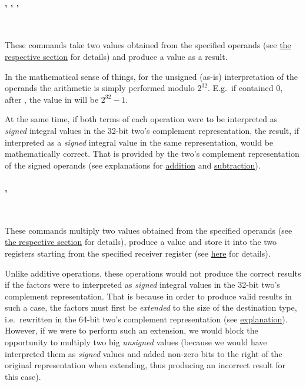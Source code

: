 \paragraph{, , , }\

These commands take two  values obtained from the specified operands
(see \hyperlink{types:twos_complement}{the respective section} for details)
and produce a  value as a result.

In the mathematical sense of things, for the unsigned (as-is) interpretation of
the operands the arithmetic is simply performed modulo $2^{32}$.
E.g.\ if  contained 0, after ,
the value in  will be $2^{32}-1$.

At the same time, if both terms of each operation were to be interpreted as
\textit{signed} integral values in the 32-bit two's complement representation,
the result, if interpreted as a \textit{signed} integral value in the same
representation, would be mathematically correct.
That is provided by the two's complement representation of the signed operands
(see explanations for
\href{https://en.wikipedia.org/wiki/Two\%27s_complement#Addition}{addition} and
\href{https://en.wikipedia.org/wiki/Two\%27s_complement#Subtraction}
{subtraction}).

\vspace{-0.35cm}

\paragraph{, }\

These commands multiply two  values obtained from the specified
operands (see \hyperlink{types:twos_complement}{the respective section}
for details), produce a  value and store it into the two registers
starting from the specified receiver register
(see \hyperlink{types:two_words_storage}{here} for details).

Unlike additive operations, these operations would not produce the correct
results if the factors were to interpreted as \textit{signed} integral values
in the 32-bit two's complement representation.
That is because in order to produce valid results in such a case,
the factors must first be \textit{extended} to the size of the destination type,
i.e.\ rewritten in the 64-bit two's complement representation (see
\href{https://en.wikipedia.org/wiki/Two\%27s_complement#Multiplication}
{explanation}).
However, if we were to perform such an extension, we would block the opportunity
to multiply two big \textit{unsigned} values (because we would have interpreted
them as \textit{signed} values and added non-zero bits to the right of
the original representation when extending, thus producing an incorrect result
for this case).

